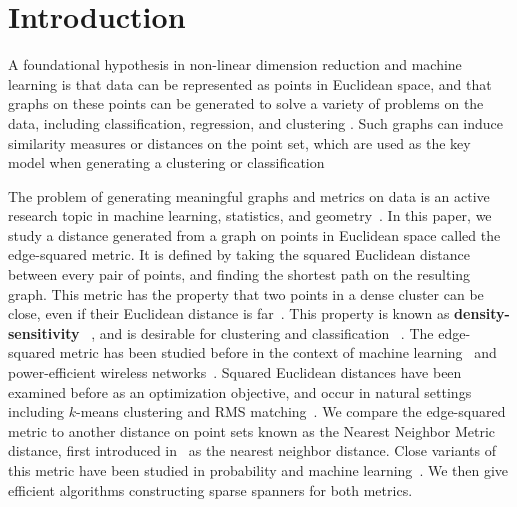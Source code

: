 \section{Introduction}

A foundational hypothesis in non-linear dimension reduction and machine
learning is that data can be represented as points in Euclidean space,
and that graphs on these points can be generated to solve a variety of
problems on the data, including classification, regression, and clustering \cite{Daitch09, Chen11,vL09, Dong11, Hashi15,
vonluxburg13density, mcqueen16megaman}.
Such graphs can induce similarity measures or distances on the point set,
which are used as the key model when generating a clustering or
classification~\cite{Daitch09, bijral11semiSupLearningDBD, tenenbaum00global}

The problem of generating meaningful graphs and metrics on data is an active research topic in machine learning, statistics, and
geometry~\cite{hein07graph, amenta99surface, sajama05estimatingDBDM, vincent03,
bijral11semiSupLearningDBD, Hashi15, alamgir12shortest, ting10analysis,
gorban07principal, bookDey2007, cavanna16adaptive, Gottlieb14, vL04,
agarwal16efficient, SridharMaster, hwang2016}.
%
In this paper, we study a distance generated from a graph
on points in Euclidean space called the edge-squared metric. It
is defined by taking the squared Euclidean distance between every pair of
points, and finding the shortest path on the resulting graph.
This metric has the property that two points
in a dense cluster can be close, even if their Euclidean
distance is far~\cite{bijral11semiSupLearningDBD}.
This property is known as \textbf{density-sensitivity}
~\cite{vincent03}, and is
desirable for clustering and classification
~\cite{sajama05estimatingDBDM, alamgir12shortest, hwang2016,
cohen15approximating}. The edge-squared metric has been studied
before in the
context of machine learning~\cite{bijral11semiSupLearningDBD, vincent03, hwang2016, alamgir12shortest,
cohen15approximating} and
power-efficient wireless
networks~\cite{LiWan2001, LiWan2002}.
Squared Euclidean distances have been
examined before as an optimization objective, and occur in
natural settings including $k$-means clustering and RMS
matching~\cite{macqueen67,Agarwal12}.
We compare the edge-squared metric to another
distance on point sets known as the Nearest Neighbor Metric distance,
first introduced in~\cite{cohen15approximating} as the nearest neighbor
distance. Close variants of this metric have been studied in
probability and machine learning~\cite{sajama05estimatingDBDM, cohen15approximating,
hwang2016}. We then give efficient algorithms constructing sparse
spanners for both metrics.


